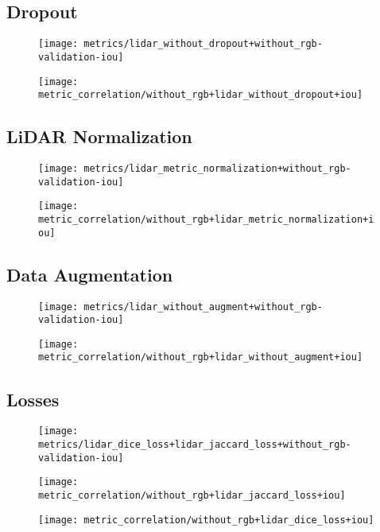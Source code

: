 \subsection{Dropout}

\begin{figure}[H]
  \centering
  \texttt{[image: metrics/lidar\_without\_dropout+without\_rgb-validation-iou]}
\end{figure}

\begin{figure}[H]
  \centering
  \texttt{[image: metric\_correlation/without\_rgb+lidar\_without\_dropout+iou]}
\end{figure}

\subsection{LiDAR Normalization}

\begin{figure}[H]
  \centering
  \texttt{[image: metrics/lidar\_metric\_normalization+without\_rgb-validation-iou]}
\end{figure}

\begin{figure}[H]
  \centering
  \texttt{[image: metric\_correlation/without\_rgb+lidar\_metric\_normalization+iou]}
\end{figure}

\subsection{Data Augmentation}

\begin{figure}[H]
  \centering
  \texttt{[image: metrics/lidar\_without\_augment+without\_rgb-validation-iou]}
\end{figure}

\begin{figure}[H]
  \centering
  \texttt{[image: metric\_correlation/without\_rgb+lidar\_without\_augment+iou]}
\end{figure}

\subsection{Losses}

\begin{figure}[H]
  \centering
  \texttt{[image: metrics/lidar\_dice\_loss+lidar\_jaccard\_loss+without\_rgb-validation-iou]}
\end{figure}

\begin{figure}[H]
  \centering
  \texttt{[image: metric\_correlation/without\_rgb+lidar\_jaccard\_loss+iou]}
\end{figure}

\begin{figure}[H]
  \centering
  \texttt{[image: metric\_correlation/without\_rgb+lidar\_dice\_loss+iou]}
\end{figure}
